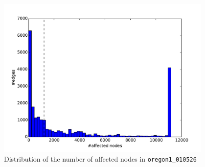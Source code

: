 \begin{figure}[h!]
  \includegraphics[width=0.95\textwidth]{figures/oregon1-affected}
  \caption{Distribution of the number of affected nodes in \texttt{oregon1\_010526}}
  \label{fig:histOregon1}
\end{figure}

